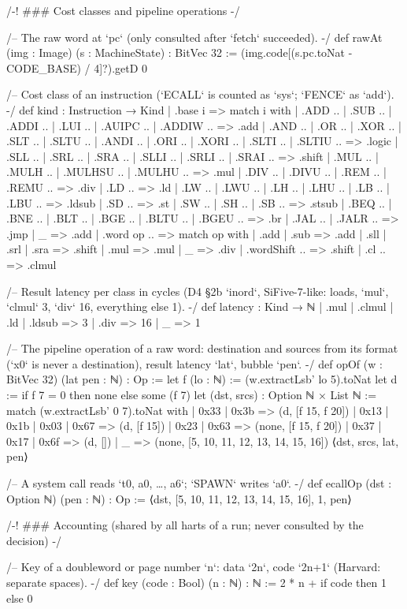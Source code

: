 \begin{leancode}[fontsize=\scriptsize,label={\footnotesize Contract/Machine.lean}]
/-! ### Cost classes and pipeline operations -/

/-- The raw word at `pc` (only consulted after `fetch` succeeded). -/
def rawAt (img : Image) (s : MachineState) : BitVec 32 :=
  (img.code[(s.pc.toNat - CODE_BASE) / 4]?).getD 0

/-- Cost class of an instruction (`ECALL` is counted as `sys`; `FENCE` as `add`). -/
def kind : Instruction → Kind
  | .base i =>
    match i with
    | .ADD .. | .SUB .. | .ADDI .. | .LUI .. | .AUIPC .. | .ADDIW .. => .add
    | .AND .. | .OR .. | .XOR .. | .SLT .. | .SLTU .. | .ANDI .. | .ORI .. | .XORI .. | .SLTI .. | .SLTIU .. =>
        .logic
    | .SLL .. | .SRL .. | .SRA .. | .SLLI .. | .SRLI .. | .SRAI .. => .shift
    | .MUL .. | .MULH .. | .MULHSU .. | .MULHU .. => .mul
    | .DIV .. | .DIVU .. | .REM .. | .REMU .. => .div
    | .LD .. => .ld
    | .LW .. | .LWU .. | .LH .. | .LHU .. | .LB .. | .LBU .. => .ldsub
    | .SD .. => .st
    | .SW .. | .SH .. | .SB .. => .stsub
    | .BEQ .. | .BNE .. | .BLT .. | .BGE .. | .BLTU .. | .BGEU .. => .br
    | .JAL .. | .JALR .. => .jmp
    | _ => .add
  | .word op .. => match op with | .add | .sub => .add | .sll | .srl | .sra => .shift | .mul => .mul | _ => .div
  | .wordShift .. => .shift
  | .cl .. => .clmul

/-- Result latency per class in cycles (D4 §2b `inord`, SiFive-7-like: loads, `mul`, `clmul` 3,
`div` 16, everything else 1). -/
def latency : Kind → ℕ
  | .mul | .clmul | .ld | .ldsub => 3
  | .div => 16
  | _ => 1

/-- The pipeline operation of a raw word: destination and sources from its format (`x0` is never
a destination), result latency `lat`, bubble `pen`. -/
def opOf (w : BitVec 32) (lat pen : ℕ) : Op :=
  let f (lo : ℕ) := (w.extractLsb' lo 5).toNat
  let d := if f 7 = 0 then none else some (f 7)
  let (dst, srcs) : Option ℕ × List ℕ := match (w.extractLsb' 0 7).toNat with
    | 0x33 | 0x3b => (d, [f 15, f 20])
    | 0x13 | 0x1b | 0x03 | 0x67 => (d, [f 15])
    | 0x23 | 0x63 => (none, [f 15, f 20])
    | 0x37 | 0x17 | 0x6f => (d, [])
    | _ => (none, [5, 10, 11, 12, 13, 14, 15, 16])
  ⟨dst, srcs, lat, pen⟩

/-- A system call reads `t0, a0, …, a6`; `SPAWN` writes `a0`. -/
def ecallOp (dst : Option ℕ) (pen : ℕ) : Op := ⟨dst, [5, 10, 11, 12, 13, 14, 15, 16], 1, pen⟩

/-! ### Accounting (shared by all harts of a run; never consulted by the decision) -/

/-- Key of a doubleword or page number `n`: data `2n`, code `2n+1` (Harvard: separate spaces). -/
def key (code : Bool) (n : ℕ) : ℕ := 2 * n + if code then 1 else 0


\end{leancode}
